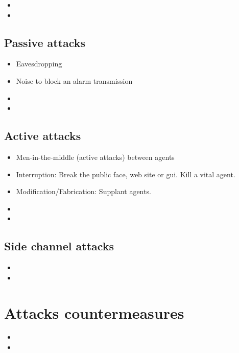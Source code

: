 \documentclass[10pt,a4paper,twoside]{llncs}
\begin{document}
\begin{itemize}
 \item
 \item 
\end{itemize}

%
\subsection{Passive attacks \label{sec:passiveAttacks}}

\begin{itemize}
 \item Eavesdropping
 \item Noise to block an alarm transmission
 \item 
 \item 
\end{itemize}

%
\subsection{Active attacks \label{sec:activeAttacks}}

\begin{itemize}
 \item Men-in-the-middle (active attacks) between agents
 \item Interruption: Break the public face, web site or gui. Kill a vital agent.
 \item Modification/Fabrication: Supplant agents.
 \item 
 \item 
\end{itemize}

%
\subsection{Side channel attacks \label{sec:sideChannelAttacks}}

\begin{itemize}
 \item
 \item 
\end{itemize}

%
\section{Attacks countermeasures \label{sec:countermeasures}}

\begin{itemize}
 \item
 \item 
\end{itemize}
\end{document}
